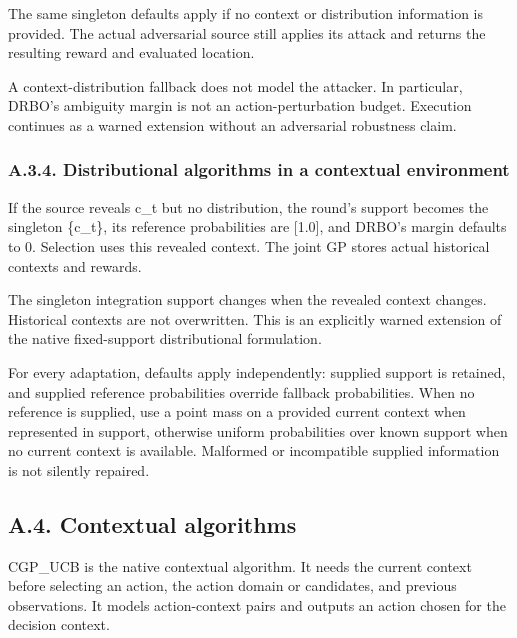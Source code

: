 \documentclass[10pt,a4paper]{article}
\begin{document}
The same singleton defaults apply if no context or distribution information is provided. The actual adversarial source still applies its attack and returns the resulting reward and evaluated location.


A context-distribution fallback does not model the attacker. In particular,\allowbreak{} DRBO's ambiguity margin is not an action-perturbation budget. Execution continues as a warned extension without an adversarial robustness claim.


\subsubsection*{A.3.4. Distributional algorithms in a contextual environment}

If the source reveals c\_\allowbreak{}t but no distribution,\allowbreak{} the round's support becomes the singleton \{c\_\allowbreak{}t\},\allowbreak{} its reference probabilities are [1.0],\allowbreak{} and DRBO's margin defaults to 0. Selection uses this revealed context. The joint GP stores actual historical contexts and rewards.


The singleton integration support changes when the revealed context changes. Historical contexts are not overwritten. This is an explicitly warned extension of the native fixed-support distributional formulation.


For every adaptation,\allowbreak{} defaults apply independently: supplied support is retained,\allowbreak{} and supplied reference probabilities override fallback probabilities. When no reference is supplied,\allowbreak{} use a point mass on a provided current context when represented in support,\allowbreak{} otherwise uniform probabilities over known support when no current context is available. Malformed or incompatible supplied information is not silently repaired.


\subsection*{A.4. Contextual algorithms}

CGP\_\allowbreak{}UCB is the native contextual algorithm. It needs the current context before selecting an action,\allowbreak{} the action domain or candidates,\allowbreak{} and previous observations. It models action-context pairs and outputs an action chosen for the decision context.
\end{document}
